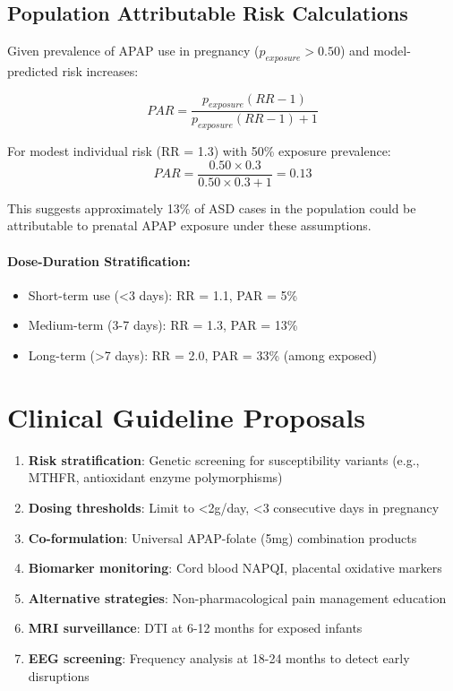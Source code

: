 \documentclass[11pt]{article}
\let\oldsection\section
\renewcommand{\section}[1]{\oldsection{#1}\setlength{\leftskip}{0em}}
\let\oldsubsection\subsection
\renewcommand{\subsection}[1]{\oldsubsection{#1}\setlength{\leftskip}{0.75em}}
\begin{document}
\subsection{Population Attributable Risk Calculations}

Given prevalence of APAP use in pregnancy ($p_{exposure} > 0.50$) and model-predicted risk increases:

\begin{equation}
PAR = \frac{p_{exposure}(RR - 1)}{p_{exposure}(RR - 1) + 1}
\end{equation}

For modest individual risk (RR = 1.3) with 50\% exposure prevalence:
\begin{equation}
PAR = \frac{0.50 \times 0.3}{0.50 \times 0.3 + 1} = 0.13
\end{equation}

This suggests approximately 13\% of ASD cases in the population could be attributable to prenatal APAP exposure under these assumptions.

\paragraph{Dose-Duration Stratification:}
\begin{itemize}
\item Short-term use (<3 days): RR = 1.1, PAR = 5\%
\item Medium-term (3-7 days): RR = 1.3, PAR = 13\%
\item Long-term (>7 days): RR = 2.0, PAR = 33\% (among exposed)
\end{itemize}

\section{Clinical Guideline Proposals}

\begin{enumerate}
\item \textbf{Risk stratification}: Genetic screening for susceptibility variants (e.g., MTHFR, antioxidant enzyme polymorphisms)
\item \textbf{Dosing thresholds}: Limit to <2g/day, <3 consecutive days in pregnancy
\item \textbf{Co-formulation}: Universal APAP-folate (5mg) combination products
\item \textbf{Biomarker monitoring}: Cord blood NAPQI, placental oxidative markers
\item \textbf{Alternative strategies}: Non-pharmacological pain management education
\item \textbf{MRI surveillance}: DTI at 6-12 months for exposed infants
\item \textbf{EEG screening}: Frequency analysis at 18-24 months to detect early disruptions
\end{enumerate}
\end{document}
